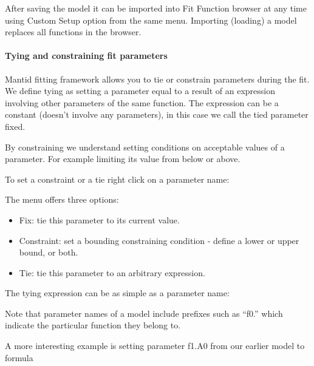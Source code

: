 \documentclass[letterpaper,10pt,english,openany]{sphinxmanual}
\begin{document}
After saving the model it can be imported into Fit Function browser at
any time using Custom Setup option from the same menu. Importing
(loading) a model replaces all functions in the browser.


\paragraph{Tying and constraining fit parameters}
\label{\detokenize{mantid_basic_course/fitting_data/01_fitting_models_to_data:tying-and-constraining-fit-parameters}}
Mantid fitting framework allows you to tie or constrain parameters
during the fit. We define tying as setting a parameter equal to a result
of an expression involving other parameters of the same function. The
expression can be a constant (doesn’t involve any parameters), in this
case we call the tied parameter fixed.

By constraining we understand setting conditions on acceptable values of
a parameter. For example limiting its value from below or above.

To set a constraint or a tie right click on a parameter name:

\begin{figure}[H]
\centering

\noindent{}
\end{figure}

The menu offers three options:
\begin{itemize}
\item {} 
Fix: tie this parameter to its current value.

\item {} 
Constraint: set a bounding constraining condition - define a lower or
upper bound, or both.

\item {} 
Tie: tie this parameter to an arbitrary expression.

\end{itemize}

The tying expression can be as simple as a parameter name:


Note that parameter names of a model include prefixes such as “f0.”
which indicate the particular function they belong to.

A more interesting example is setting parameter f1.A0 from our earlier
model to formula

\end{document}
